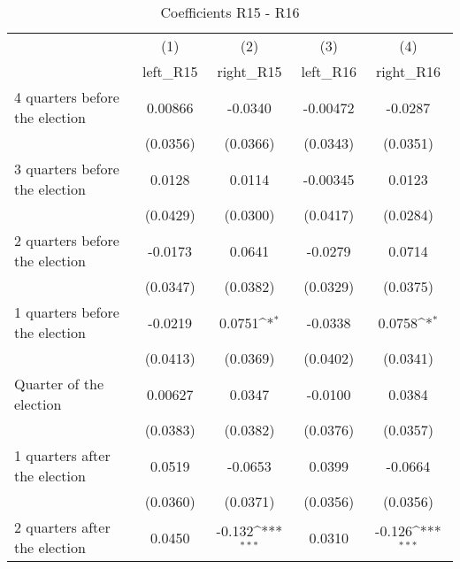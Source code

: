 \begin{table}[htbp]\centering
\def\sym#1{\ifmmode^{#1}\else\(^{#1}\)\fi}
\caption{Coefficients R15 - R16}
\begin{tabular}{l*{4}{c}}
\hline\hline
                    &\multicolumn{1}{c}{(1)}&\multicolumn{1}{c}{(2)}&\multicolumn{1}{c}{(3)}&\multicolumn{1}{c}{(4)}\\
                    &\multicolumn{1}{c}{left\_R15}&\multicolumn{1}{c}{right\_R15}&\multicolumn{1}{c}{left\_R16}&\multicolumn{1}{c}{right\_R16}\\
\hline
 4 quarters before the election&     0.00866         &     -0.0340         &    -0.00472         &     -0.0287         \\
                    &    (0.0356)         &    (0.0366)         &    (0.0343)         &    (0.0351)         \\
[1em]
 3 quarters before the election&      0.0128         &      0.0114         &    -0.00345         &      0.0123         \\
                    &    (0.0429)         &    (0.0300)         &    (0.0417)         &    (0.0284)         \\
[1em]
 2 quarters before the election&     -0.0173         &      0.0641         &     -0.0279         &      0.0714         \\
                    &    (0.0347)         &    (0.0382)         &    (0.0329)         &    (0.0375)         \\
[1em]
 1 quarters before the election&     -0.0219         &      0.0751\sym{*}  &     -0.0338         &      0.0758\sym{*}  \\
                    &    (0.0413)         &    (0.0369)         &    (0.0402)         &    (0.0341)         \\
[1em]
Quarter of the election&     0.00627         &      0.0347         &     -0.0100         &      0.0384         \\
                    &    (0.0383)         &    (0.0382)         &    (0.0376)         &    (0.0357)         \\
[1em]
 1 quarters after the election&      0.0519         &     -0.0653         &      0.0399         &     -0.0664         \\
                    &    (0.0360)         &    (0.0371)         &    (0.0356)         &    (0.0356)         \\
[1em]
 2 quarters after the election&      0.0450         &      -0.132\sym{***}&      0.0310         &      -0.126\sym{***}\\

\end{tabular}
\end{table}
